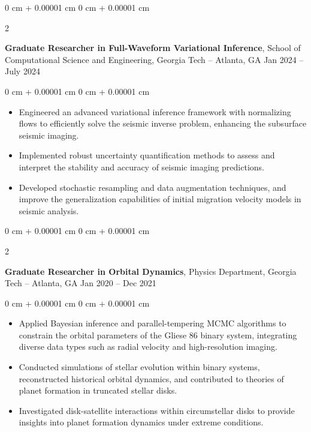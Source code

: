 \documentclass[10pt, letterpaper]{article}
\newenvironment{highlights}{
    \begin{itemize}[
        topsep=0.10 cm,
        parsep=0.10 cm,
        partopsep=0pt,
        itemsep=0pt,
        leftmargin=0 cm + 10pt
    ]
}{
    \end{itemize}
} %
\newenvironment{onecolentry}{
    \begin{adjustwidth}{
        0 cm + 0.00001 cm
    }{
        0 cm + 0.00001 cm
    }
}{
    \end{adjustwidth}
} %
\newenvironment{twocolentry}[2][]{
    \onecolentry
    \def\secondColumn{#2}
    \setcolumnwidth{\fill, 4.5 cm}
    \begin{paracol}{2}
}{
    \switchcolumn \raggedleft \secondColumn
    \end{paracol}
    \endonecolentry
} %
\begin{document}
        
        \begin{twocolentry}{
            Jan 2024 – July 2024
        }
            \textbf{Graduate Researcher in Full-Waveform Variational Inference}, School of Computational Science and Engineering, Georgia Tech -- Atlanta, GA\end{twocolentry}

        \vspace{0.10 cm}
        \begin{onecolentry}
            \begin{highlights}
                \item Engineered an advanced variational inference framework with normalizing flows to efficiently solve the seismic inverse problem, enhancing the subsurface seismic imaging.
                \item Implemented robust uncertainty quantification methods to assess and interpret the stability and accuracy of seismic imaging predictions.
                \item Developed stochastic resampling and data augmentation techniques, and improve the generalization capabilities of initial migration velocity models in seismic analysis.
            \end{highlights}
        \end{onecolentry}


        \vspace{0.2 cm}

        \begin{twocolentry}{
            Jan 2020 – Dec 2021
        }
            \textbf{Graduate Researcher in Orbital Dynamics}, Physics Department, Georgia Tech -- Atlanta, GA\end{twocolentry}

        \vspace{0.10 cm}
        \begin{onecolentry}
            \begin{highlights}
                \item Applied Bayesian inference and parallel-tempering MCMC algorithms to constrain the orbital parameters of the Gliese 86 binary system, integrating diverse data types such as radial velocity and high-resolution imaging.
                \item Conducted simulations of stellar evolution within binary systems, reconstructed historical orbital dynamics, and contributed to theories of planet formation in truncated stellar disks.
                \item Investigated disk-satellite interactions within circumstellar disks to provide insights into planet formation dynamics under extreme conditions.
            \end{highlights}
        \end{onecolentry}
\end{document}
